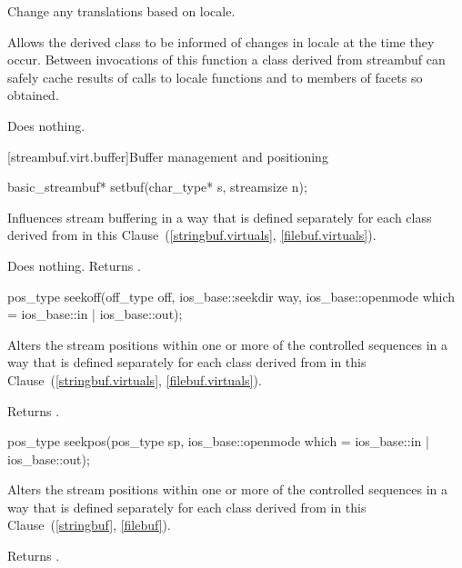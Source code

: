 \begin{itemdescr}
\pnum
\effects
Change any translations based on locale.

\pnum
\remarks
Allows the derived class to be informed of changes in locale at the
time they occur.
Between invocations of this function a class derived
from streambuf can safely cache results of calls to locale functions
and to members of facets so obtained.

\pnum
{}
Does nothing.
\end{itemdescr}

[streambuf.virt.buffer]{Buffer management and positioning}

%
\begin{itemdecl}
basic_streambuf* setbuf(char_type* s, streamsize n);
\end{itemdecl}

\begin{itemdescr}
\pnum
\effects
Influences stream buffering in a way that is defined separately for each class
derived from
in this Clause~(\ref{stringbuf.virtuals},
\ref{filebuf.virtuals}).

\pnum
{}
Does nothing.
Returns
.
\end{itemdescr}

%
\begin{itemdecl}
pos_type seekoff(off_type off, ios_base::seekdir way,
                 ios_base::openmode which
                  = ios_base::in | ios_base::out);
\end{itemdecl}

\begin{itemdescr}
\pnum
\effects
Alters the stream positions within one or more of
the controlled sequences in a way that is defined separately for each class
derived from
in this Clause~(\ref{stringbuf.virtuals},
\ref{filebuf.virtuals}).

\pnum
{}
Returns
.
\end{itemdescr}

%
\begin{itemdecl}
pos_type seekpos(pos_type sp,
                 ios_base::openmode which
                  = ios_base::in | ios_base::out);
\end{itemdecl}

\begin{itemdescr}
\pnum
\effects
Alters the stream positions within one or more of
the controlled sequences in a way that is defined separately for each class
derived from
in this Clause~(\ref{stringbuf},
\ref{filebuf}).

\pnum
{}
Returns
.
\end{itemdescr}

